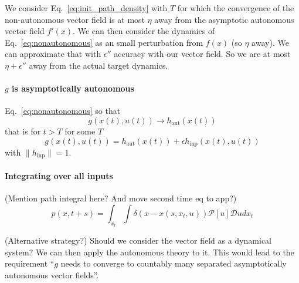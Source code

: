 \documentclass{article}
\newcommand{\ascomment}[1]{\textcolor{ascolor}{(#1)}}
\theoremstyle{definition} \newtheorem{definition}{Definition}
\theoremstyle{remark} \newtheorem{remark}{Remark}
\newcounter{ct}
\begin{document}
We consider Eq.~\ref{eq:init_path_density} with $T$ for which the convergence of the non-autonomous vector field is at most $\eta$ away from the asymptotic autonomous vector field $f'(x)$. %
We can then consider the dynamics of Eq.~\ref{eq:nonautonomous} as an small perturbation from $f(x)$ (so $\eta$ away).
We can approximate that with $\epsilon''$ accuracy with our vector field.
So we are at most $\eta+\epsilon''$ away from the actual target dynamics.



\paragraph{$g$ is asymptotically autonomous} %
Eq.~\ref{eq:nonautonomous} so that 
\begin{equation}\label{eq:inputdriven_asymp}
g(x(t), u(t)) \rightarrow h_{\operatorname{aut}}(x(t))
\end{equation}
that is for $t>T$ for some $T$ %
\begin{equation}\label{eq:inputdriven_asymp}
g(x(t), u(t)) =  h_{\operatorname{aut}}(x(t)) + \epsilon h_{\operatorname{inp}}(x(t), u(t))
\end{equation}
with $\|h_{\operatorname{inp}}\| = 1$.



\paragraph{Integrating over all inputs}
\ascomment{Mention path integral here? And move second time eq to app?}
\begin{equation}
    p(x,t+s) = \int_{x_t} \int \delta(x - x(s, x_t, u)) \mathcal{P}[u] \mathcal{D}u dx_t
\end{equation}




\ascomment{Alternative strategy?}
Should we consider the vector field as a dynamical system?
We can then apply the autonomous theory to it.
This would lead to the requirement ``$g$ needs to converge to countably many separated asymptotically autonomous vector fields''.
\end{document}
